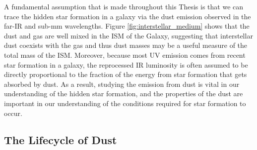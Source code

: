 A fundamental assumption that is made throughout this Thesis is that we can trace the hidden star formation in a galaxy via the dust emission observed in the far-IR and sub-mm wavelengths. Figure \ref{fig:interstellar_medium} shows that the dust and gas are well mixed in the ISM of the Galaxy, suggesting that interstellar dust coexists with the gas and thus dust masses may be a useful measure of the total mass of the ISM. Moreover, because most UV emission comes from recent star formation in a galaxy, the reprocessed IR luminosity is often assumed to be directly proportional to the fraction of the energy from star formation that gets absorbed by dust. As a result, studying the emission from dust is vital in our understanding of the hidden star formation, and the properties of the dust are important in our understanding of the conditions required for star formation to occur.

\subsection{The Lifecycle of Dust}
\label{sec:lifecycle_of_dust}

